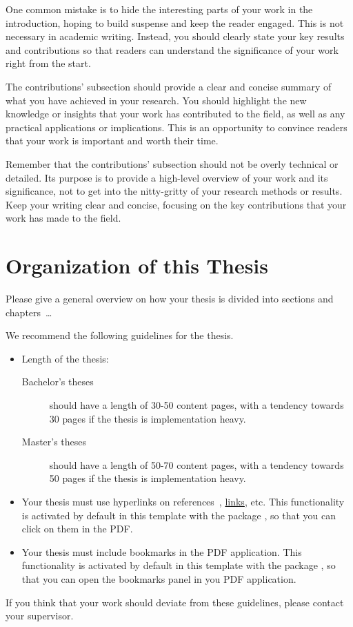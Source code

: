 One common mistake is to hide the interesting parts of your work in the introduction, hoping to build suspense and keep the reader engaged. This is not necessary in academic writing. Instead, you should clearly state your key results and contributions so that readers can understand the significance of your work right from the start.

The contributions' subsection should provide a clear and concise summary of what you have achieved in your research. You should highlight the new knowledge or insights that your work has contributed to the field, as well as any practical applications or implications. This is an opportunity to convince readers that your work is important and worth their time.

Remember that the contributions' subsection should not be overly technical or detailed. Its purpose is to provide a high-level overview of your work and its significance, not to get into the nitty-gritty of your research methods or results. Keep your writing clear and concise, focusing on the key contributions that your work has made to the field.

\section{Organization of this Thesis}
Please give a general overview on how your thesis is divided into sections and chapters~\dots

We recommend the following guidelines for the thesis.

\begin{itemize}
    \item Length of the thesis:
    \begin{description}
        \item[Bachelor's theses] should have a length of 30-50 content pages, with a tendency towards 30 pages if the thesis is implementation heavy.
        \item[Master's theses] should have a length of 50-70 content pages, with a tendency towards 50 pages if the thesis is implementation heavy.
    \end{description}
    \item Your thesis must use hyperlinks on references~\cite{AviramSSHDSVAHD16}, \href{https://example.com}{links}, etc. This functionality is activated by default in this template with the package , so that you can click on them in the PDF.
    \item Your thesis must include bookmarks in the PDF application. This functionality is activated by default in this template with the package , so that you can open the bookmarks panel in you PDF application.
\end{itemize}

If you think that your work should deviate from these guidelines, please contact your supervisor.